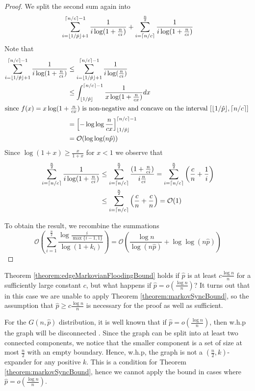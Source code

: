 \begin{proof}
	We split the second sum again into
	$$	
		\sum_{i=\floor*{1/\hat{p}} + 1}^{\ceil*{n/c}-1} \frac{1}{i\log(1+\frac{n}{ci})} 
		+ 
		\sum_{i=\ceil*{n/c}}^\frac{n}{2} \frac{1}{i\log(1+\frac{n}{ci})} 
	$$
	Note that
	\begin{align*}
		\sum_{i=\floor*{1/\hat{p}} + 1}^{\ceil*{n/c}-1} \frac{1}{i\log(1+\frac{n}{ci})} 
		& \leq \sum_{i=\floor*{1/\hat{p}} + 1}^{\ceil*{n/c}-1} \frac{1}{i\log(\frac{n}{ci})} \\
		& \leq \int_{\floor*{1/\hat{p}}}^{\ceil*{n/c}-1} \frac{1}{x\log(1+\frac{n}{cx})} dx \\
		\intertext{since $f(x) = x\log(1+\frac{n}{cx})$ is non-negative and concave on the interval $[\floor*{1/\hat{p}}, \ceil*{n/c}]$ }
		& = \left[-\log\log \frac{n}{cx}\right]_{\floor*{1/\hat{p}}}^{\ceil*{n/c}-1} \\
		&= \mathcal{O}(\log \log (n \hat{p}))
	\end{align*}
	Since $\log(1+x) \geq \frac{x}{1+x}$ for $x < 1$ we observe that
	\begin{align*}
		\sum_{i=\ceil*{n/c}}^\frac{n}{2} \frac{1}{i\log(1+\frac{n}{ci})} 
		& \leq 
		\sum_{i=\ceil*{n/c}}^\frac{n}{2} \frac{(1 + \frac{n}{ci})}{i\frac{n}{ci}} 
		= 
		\sum_{i=\ceil*{n/c}}^\frac{n}{2} \left( \frac{c}{n} + \frac{1}{i} \right) \\
		& \leq 
		\sum_{i=\ceil*{n/c}}^\frac{n}{2} \left( \frac{c}{n} + \frac{c}{n} \right)
		= \mathcal{O}(1)
	\end{align*}

	To obtain the result, we recombine the summations
	$$
		\mathcal{O}\left(\sum_{i=1}^\frac{n}{2} \frac{\log \frac{i}{\max\{i-1,1\}}}{\log(1+k_i)}\right) =
		\mathcal{O}\left(\frac{\log n}{\log (n\hat{p})} + \log \log (n\hat{p})\right)
	$$

\end{proof}

Theorem \ref{theorem:edgeMarkovianFloodingBound} holds if $\hat{p}$ is at least $c \frac{\log n}{n}$ for a sufficiently large constant $c$, but what happens if $\hat{p} = o(\frac{\log n}{n})$? 
It turns out that in this case we are unable to apply Theorem \ref{theorem:markovSyncBound}, so the assumption that $\hat{p} \geq c \frac{\log n}{n}$ is necessary for the proof as well as sufficient.

For the $G(n, \hat{p})$ distribution, it is well known that if $\hat{p} = o(\frac{\log n}{n})$, then w.h.p the graph will be disconnected \cite{complexNetworksRandomGraphs}. Since the graph can be split into at least two connected components, we notice that the smaller component is a set of size at most $\frac{n}{2}$ with an empty boundary. Hence, w.h.p, the graph is not a $(\frac{n}{2}, k)$-expander for any positive $k$. This is a condition for Theorem \ref{theorem:markovSyncBound}, hence we cannot apply the bound in cases where $\hat{p} = o(\frac{\log n}{n})$.

